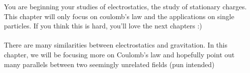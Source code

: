 You are beginning your studies of electrostatics, the study of stationary charges. This chapter will only focus on coulomb's law and the applications on single particles. If you think this is hard, you'll love the next chapters :)
\\\\
There are many similarities between electrostatics and gravitation. In this chapter, we will be focusing more on Coulomb's law and hopefully point out many parallels between two seemingly unrelated fields (pun intended)
